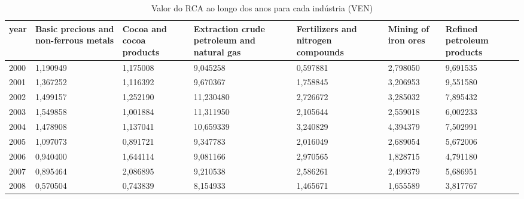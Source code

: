 \begin{table}
\centering
\caption{Valor do RCA ao longo dos anos para cada indústria (VEN)}
\begin{tabular}{p{1cm}p{2cm}p{2cm}p{2cm}p{2cm}p{2cm}p{2cm}}
\toprule
 year &  Basic precious and non-ferrous metals &  Cocoa and cocoa products &  Extraction crude petroleum and natural gas &  Fertilizers and nitrogen compounds &  Mining of iron ores &  Refined petroleum products \\
\midrule
 2000 &                               1,190949 &                  1,175008 &                                    9,045258 &                            0,597881 &             2,798050 &                    9,691535 \\
 2001 &                               1,367252 &                  1,116392 &                                    9,670367 &                            1,758845 &             3,206953 &                    9,551580 \\
 2002 &                               1,499157 &                  1,252190 &                                   11,230480 &                            2,726672 &             3,285032 &                    7,895432 \\
 2003 &                               1,549858 &                  1,001884 &                                   11,311950 &                            2,105644 &             2,559018 &                    6,002233 \\
 2004 &                               1,478908 &                  1,137041 &                                   10,659339 &                            3,240829 &             4,394379 &                    7,502991 \\
 2005 &                               1,097073 &                  0,891721 &                                    9,347783 &                            2,016049 &             2,689054 &                    5,672006 \\
 2006 &                               0,940400 &                  1,644114 &                                    9,081166 &                            2,970565 &             1,828715 &                    4,791180 \\
 2007 &                               0,895464 &                  2,086895 &                                    9,210538 &                            2,586261 &             2,499379 &                    5,686951 \\
 2008 &                               0,570504 &                  0,743839 &                                    8,154933 &                            1,465671 &             1,655589 &                    3,817767 \\

\end{tabular}
\end{table}
